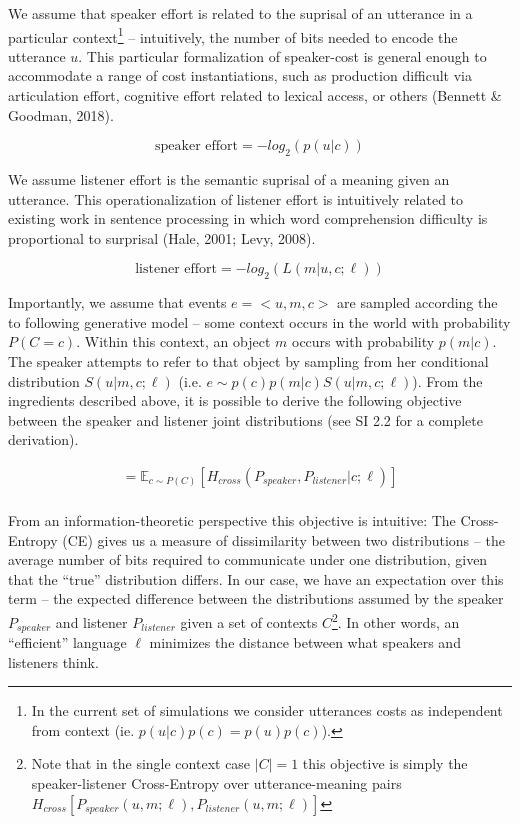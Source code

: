 \documentclass[10pt, letterpaper]{article}
\begin{document}
We assume that speaker effort is related to the suprisal of an utterance
in a particular
context\footnote{In the current set of simulations we consider utterances costs as independent from context (ie. $p(u|c)p(c)=p(u)p(c)$).}
-- intuitively, the number of bits needed to encode the utterance \(u\).
This particular formalization of speaker-cost is general enough to
accommodate a range of cost instantiations, such as production difficult
via articulation effort, cognitive effort related to lexical access, or
others (Bennett \& Goodman, 2018).\par

\[\text{speaker effort} = -log_2(p(u|c))\]

We assume listener effort is the semantic suprisal of a meaning given an
utterance. This operationalization of listener effort is intuitively
related to existing work in sentence processing in which word
comprehension difficulty is proportional to surprisal (Hale, 2001; Levy,
2008).

\[\text{listener effort} = -log_2(L(m|u, c; \ell))\]

Importantly, we assume that events \(e = <u, m, c>\) are sampled
according the to following generative model -- some context occurs in
the world with probability \(P(C=c)\). Within this context, an object
\(m\) occurs with probability \(p(m|c)\). The speaker attempts to refer
to that object by sampling from her conditional distribution
\(S(u|m, c; \ell)\) (i.e. \(e \sim p(c)p(m|c)S(u|m, c; \ell)\)). From
the ingredients described above, it is possible to derive the following
objective between the speaker and listener joint distributions (see SI
2.2 for a complete derivation).

\begin{equation}
\begin{split}
  = \mathbb{E}_{c \sim P(C)}[H_{cross}(P_{speaker}, P_{listener} | c; \ell)]\\
\end{split}
\end{equation}

From an information-theoretic perspective this objective is intuitive:
The Cross-Entropy (CE) gives us a measure of dissimilarity between two
distributions -- the average number of bits required to communicate
under one distribution, given that the ``true'' distribution differs. In
our case, we have an expectation over this term -- the expected
difference between the distributions assumed by the speaker
\(P_{speaker}\) and listener \(P_{listener}\) given a set of contexts
\(C\)\footnote{Note that in the single context case $|C|=1$ this objective is simply the speaker-listener Cross-Entropy over utterance-meaning pairs $H_{cross}[P_{speaker}(u, m; \ell), P_{listener}(u, m; \ell)]$}.
In other words, an ``efficient'' language \(\ell\) minimizes the
distance between what speakers and listeners think.
\end{document}
